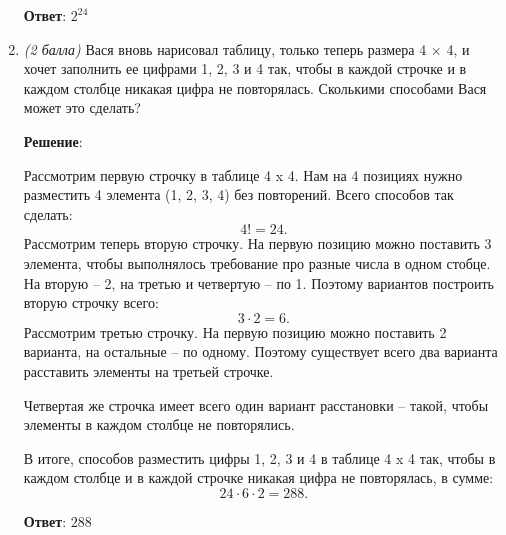 \documentclass{article}
\begin{document}
\begin{enumerate}
        \textbf{Ответ}:
        $2^{24}$

        \item \textit{(2 балла)} Вася вновь нарисовал таблицу, только теперь размера 4 × 4, и хочет заполнить ее цифрами 1, 2, 3 и 4 так, чтобы в каждой строчке и в каждом столбце никакая цифра не повторялась. Сколькими способами Вася может это сделать?
        
        \textbf{Решение}:

        Рассмотрим первую строчку в таблице 4 x 4. Нам на 4 позициях нужно разместить 4 элемента (1, 2, 3, 4) без повторений. Всего способов так сделать:
        \begin{equation}
            4! = 24.
        \end{equation}
        Рассмотрим теперь вторую строчку. На первую позицию можно поставить 3 элемента, чтобы выполнялось требование про разные числа в одном стобце. На вторую -- 2, на третью и четвертую -- по 1. Поэтому вариантов построить вторую строчку всего:
        \begin{equation}
            3\cdot 2 = 6.
        \end{equation}
        Рассмотрим третью строчку. На первую позицию можно поставить 2 варианта, на остальные -- по одному. Поэтому существует всего два варианта расставить элементы на третьей строчке.

        Четвертая же строчка имеет всего один вариант расстановки -- такой, чтобы элементы в каждом столбце не повторялись.

        В итоге, способов разместить цифры 1, 2, 3 и 4 в таблице 4 x 4 так, чтобы в каждом столбце и в каждой строчке никакая цифра не повторялась, в сумме:
        \begin{equation}
            24\cdot 6\cdot 2 = 288.
        \end{equation}

        \textbf{Ответ}:
        $288$

    \end{enumerate}
\end{document}
